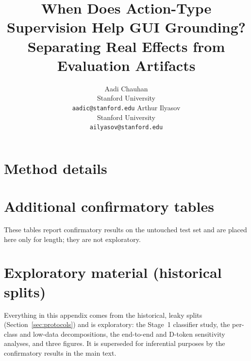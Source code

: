 \documentclass{article}
\title{When Does Action-Type Supervision Help GUI Grounding?\\
Separating Real Effects from Evaluation Artifacts}
\author{%
  Aadi Chauhan\\
  Stanford University\\
  \texttt{aadic@stanford.edu}
  \And
  Arthur Ilyasov\\
  Stanford University\\
  \texttt{ailyasov@stanford.edu}
}
\begin{document}
\maketitle






\appendix
\section{Method details}
\label{app:methods}
\datasources
\methstageone
\methobjective

\section{Additional confirmatory tables}
\label{app:confirmatory}
These tables report confirmatory results on the untouched test set and are
placed here only for length; they are not exploratory.
\tabconfperclassfloat
\tabcontrolfloat
\tablowdatafloat

\section{Exploratory material (historical splits)}
\label{app:exploratory}
Everything in this appendix comes from the historical, leaky splits
(Section~\ref{sec:protocols}) and is exploratory: the Stage~1 classifier
study, the per-class and low-data decompositions, the end-to-end and
D-token sensitivity analyses, and three figures. It is superseded for
inferential purposes by the confirmatory results in the main text.
\tableakagefloat
\expmain
\tabexploratoryfloat
\expstageone
\expperclass
\explowdata
\expetoe
\expcausal
\figexpablation
\figexpscaling
\figexpattention
\end{document}
